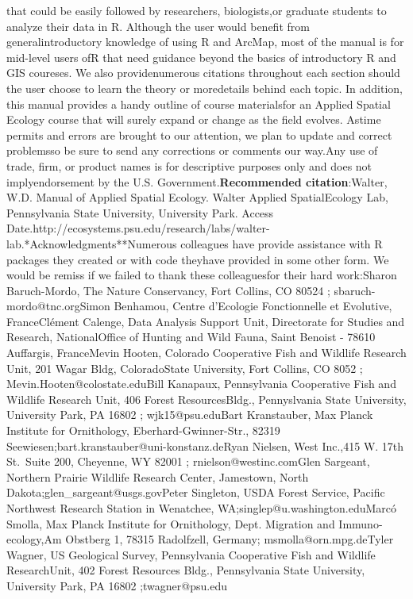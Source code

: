 \documentclass[
  letterpaper,
  DIV=11,
  numbers=noendperiod]{scrreprt}
\begin{document}
{that could be easily followed by researchers, biologists,or graduate
students to analyze their data in R. Although the user would benefit
from generalintroductory knowledge of using R and ArcMap, most of the
manual is for mid-level users ofR that need guidance beyond the basics
of introductory R and GIS coureses. We also providenumerous citations
throughout each section should the user choose to learn the theory or
moredetails behind each topic. In addition, this manual provides a handy
outline of course materialsfor an Applied Spatial Ecology course that
will surely expand or change as the field evolves. Astime permits and
errors are brought to our attention, we plan to update and correct
problemsso be sure to send any corrections or comments our way.Any use
of trade, firm, or product names is for descriptive purposes only and
does not implyendorsement by the U.S. Government.\textbf{Recommended
citation}:Walter, W.D. Manual of Applied Spatial Ecology. Walter Applied
SpatialEcology Lab, Pennsylvania State University, University Park.
Access
Date.http://ecosystems.psu.edu/research/labs/walter-lab.\newpage**Acknowledgments**Numerous
colleagues have provide assistance with R packages they created or with
code theyhave provided in some other form. We would be remiss if we
failed to thank these colleaguesfor their hard work:Sharon Baruch-Mordo,
The Nature Conservancy, Fort Collins, CO 80524 ;
sbaruch-mordo@tnc.orgSimon Benhamou, Centre d'Ecologie Fonctionnelle et
Evolutive, FranceClément Calenge, Data Analysis Support Unit,
Directorate for Studies and Research, NationalOffice of Hunting and Wild
Fauna, Saint Benoist - 78610 Auffargis, FranceMevin Hooten, Colorado
Cooperative Fish and Wildlife Research Unit, 201 Wagar Bldg,
ColoradoState University, Fort Collins, CO 8052 ;
Mevin.Hooten@colostate.eduBill Kanapaux, Pennsylvania Cooperative Fish
and Wildlife Research Unit, 406 Forest ResourcesBldg., Pennyslvania
State University, University Park, PA 16802 ; wjk15@psu.eduBart
Kranstauber, Max Planck Institute for Ornithology,
Eberhard-Gwinner-Str., 82319
Seewiesen;bart.kranstauber@uni-konstanz.deRyan Nielsen, West Inc.,415 W.
17th St.~Suite 200, Cheyenne, WY 82001 ; rnielson@westinc.comGlen
Sargeant, Northern Prairie Wildlife Research Center, Jamestown, North
Dakota;glen\_sargeant@usgs.govPeter Singleton, USDA Forest Service,
Pacific Northwest Research Station in Wenatchee,
WA;singlep@u.washington.eduMarcó Smolla, Max Planck Institute for
Ornithology, Dept. Migration and Immuno-ecology,Am Obstberg 1, 78315
Radolfzell, Germany; msmolla@orn.mpg.deTyler Wagner, US Geological
Survey, Pennsylvania Cooperative Fish and Wildlife ResearchUnit, 402
Forest Resources Bldg., Pennsylvania State University, University Park,
PA 16802 ;twagner@psu.edu}
\end{document}

